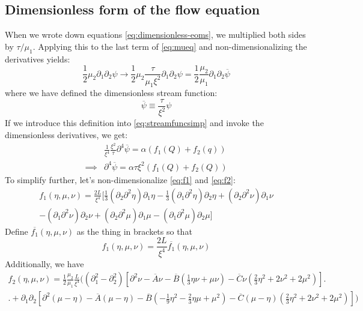 \documentclass[reqno]{article}
\begin{document}
	
	\subsection{Dimensionless form of the flow equation}
	When we wrote down equations \eqref{eq:dimensionless-eoms}, we multiplied both sides by $\tau/\mu_1$. Applying this to the last term of \eqref{eq:mueq} and non-dimensionalizing the derivatives yields:
	\begin{equation}
		\frac{1}{2} \mu_2 \partial_1 \partial_2 \psi \to \frac{1}{2} \mu_2 \frac{\tau}{\mu_1 \xi^2} \partial_1 \partial_2 \psi = \frac12 \frac{\mu_2}{\mu_1} \partial_1 \partial_2 \overline{\psi}
	\end{equation}
	where we have defined the dimensionless stream function:
	\begin{equation}
		\overline{\psi} \equiv \frac{\tau}{\xi^2} \psi
	\end{equation}
	If we introduce this definition into \eqref{eq:streamfuncsimp} and invoke the dimensionless derivatives, we get:
	\begin{equation}
	\begin{split}
		&\frac{1}{\xi^4} \frac{\xi^2}{\tau} \partial^4 \overline{\psi} 
		= \alpha \left( 
		f_1(Q) + f_2(q)
		\right)\\
		\implies &\partial^4 \overline{\psi}
		= \alpha \tau \xi^2 \left(
		f_1(Q) + f_2(Q)
		\right)
	\end{split}
	\end{equation}
	To simplify further, let's non-dimensionalize \eqref{eq:f1} and \eqref{eq:f2}:
	\begin{multline}
		f_1(\eta, \mu, \nu) = \frac{2L}{\xi^4} \bigg[ \tfrac13 \left( \partial_2\partial^2 \eta \right) \partial_1 \eta - \tfrac13 \left( \partial_1\partial^2 \eta\right)\partial_2 \eta + \left(\partial_2 \partial^2 \nu\right)\partial_1 \nu \\ - \left(\partial_1 \partial^2 \nu\right)\partial_2 \nu + \left(\partial_2 \partial^2 \mu\right)\partial_1 \mu - \left(\partial_1 \partial^2 \mu\right)\partial_2 \mu \bigg]
	\end{multline}
	Define $\overline{f_1}(\eta, \mu, \nu)$ as the thing in brackets so that
	\begin{equation}
		f_1(\eta, \mu, \nu) = \frac{2L}{\xi^4} \overline{f_1}(\eta, \mu, \nu)
	\end{equation}
	Additionally, we have
	\begin{multline}
		f_2(\eta, \mu, \nu) = \frac12 \frac{\mu_2}{\mu_1} \frac{L}{\xi^4} \biggl( \left( \partial_1^2 - \partial_2^2\right)\left[ \partial^2 \nu - \overline{A}\nu - \overline{B}\left(\tfrac{1}{3}\eta\nu + \mu\nu\right) - \overline{C}\nu\left( \tfrac{2}{3}\eta^2 + 2\nu^2 + 2\mu^2 \right) \right]\biggr. \\
		\biggl. + \partial_1\partial_2 \left[ \partial^2 \left( \mu - \eta \right) - \overline{A}\left( \mu - \eta \right) - \overline{B}\left( -\tfrac19 \eta^2 - \tfrac23 \eta\mu + \mu^2 \right) - \overline{C}\left( \mu - \eta\right) \left( \tfrac23 \eta^2 + 2\nu^2 + 2\mu^2 \right)\right] \biggr) 
	\end{multline}
\end{document}
